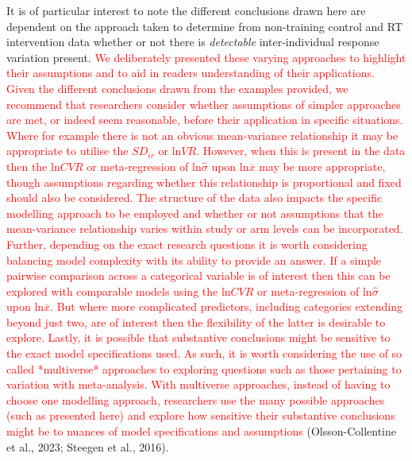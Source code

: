 \documentclass[
]{article}
\begin{document}
It is of particular interest to note the different conclusions drawn here are dependent on the approach taken to determine from non-training control and RT intervention data whether or not there is \emph{detectable} inter-individual response variation present. \textcolor{red}{We deliberately presented these varying approaches to highlight their assumptions and to aid in readers understanding of their applications. Given the different conclusions drawn from the examples provided, we recommend that researchers consider whether assumptions of simpler approaches are met, or indeed seem reasonable, before their application in specific situations. Where for example there is not an obvious mean-variance relationship it may be appropriate to utilise the $SD_{ir}$ or $\textrm{ln}VR$. However, when this is present in the data then the $\textrm{ln}CVR$ or meta-regression of $\textrm{ln}\hat\sigma$ upon $\textrm{ln}\overline{x}$ may be more appropriate, though assumptions regarding whether this relationship is proportional and fixed should also be considered. The structure of the data also impacts the specific modelling approach to be employed and whether or not assumptions that the mean-variance relationship varies within study or arm levels can be incorporated. Further, depending on the exact research questions it is worth considering balancing model complexity with its ability to provide an answer. If a simple pairwise comparison across a categorical variable is of interest then this can be explored with comparable models using the $\textrm{ln}CVR$ or meta-regression of $\textrm{ln}\hat\sigma$ upon $\textrm{ln}\overline{x}$. But where more complicated predictors, including categories extending beyond just two, are of interest then the flexibility of the latter is desirable to explore. Lastly, it is possible that substantive conclusions might be sensitive to the exact model specifications used. As such, it is worth considering the use of so called *multiverse* approaches to exploring questions such as those pertaining to variation with meta-analysis. With multiverse approaches, instead of having to choose one modelling approach, researchers use the many possible approaches (such as presented here) and explore how sensitive their substantive conclusions might be to nuances of model specifications and assumptions} (Olsson-Collentine et al., 2023; Steegen et al., 2016).
\end{document}
